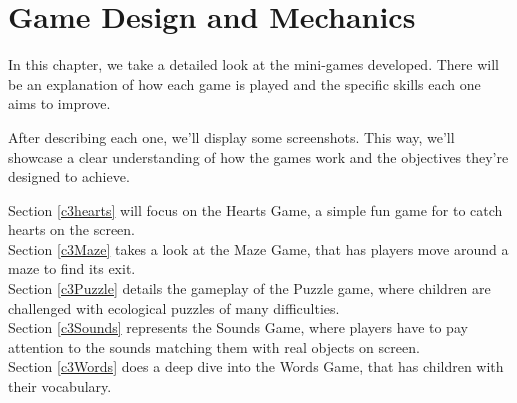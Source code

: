 \raggedbottom
\chapter{Game Design and Mechanics}
\label{cha:games_to_be_developed}


In this chapter, we take a detailed look at the mini-games developed. There will be an explanation of how each game is played and the specific skills each one aims to improve.

After describing each one, we'll display some screenshots. This way, we'll showcase a clear understanding of how the games work and the objectives they’re designed to achieve.

Section \ref{c3hearts} will focus on the Hearts Game, a simple fun game for to catch hearts on the screen.
\\Section \ref{c3Maze} takes a look at the Maze Game, that has players move around a maze to find its exit.
\\Section \ref{c3Puzzle} details the gameplay of the Puzzle game, where children are challenged with ecological puzzles of many difficulties.
\\Section \ref{c3Sounds} represents the Sounds Game, where players have to pay attention to the sounds matching them with real objects on screen.
\\Section \ref{c3Words} does a deep dive into the Words Game, that has children with their vocabulary.



